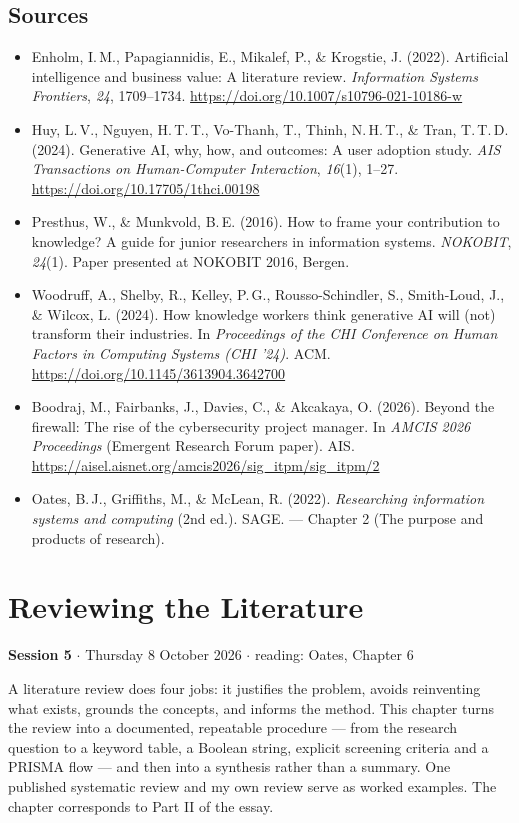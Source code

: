 \documentclass[11pt,a4paper,british,twoside=false,headings=small,chapterprefix=false,numbers=noenddot]{scrbook}
\newcommand{\sessionhead}[2]{\begin{tcolorbox}[enhanced, colback=uiamutedblue, colframe=uiamutedblue, arc=1.5pt, left=6pt, right=6pt]
  \small \textbf{Session #1} \;$\cdot$\; #2\end{tcolorbox}}
\begin{document}
\section*{Sources}
\begin{itemize}\small
  \item Enholm, I.\,M., Papagiannidis, E., Mikalef, P., \& Krogstie, J. (2022). Artificial intelligence and business value: A literature review. \emph{Information Systems Frontiers}, \emph{24}, 1709--1734. \url{https://doi.org/10.1007/s10796-021-10186-w}
  \item Huy, L.\,V., Nguyen, H.\,T.\,T., Vo-Thanh, T., Thinh, N.\,H.\,T., \& Tran, T.\,T.\,D. (2024). Generative AI, why, how, and outcomes: A user adoption study. \emph{AIS Transactions on Human-Computer Interaction}, \emph{16}(1), 1--27. \url{https://doi.org/10.17705/1thci.00198}
  \item Presthus, W., \& Munkvold, B.\,E. (2016). How to frame your contribution to knowledge? A guide for junior researchers in information systems. \emph{NOKOBIT}, \emph{24}(1). Paper presented at NOKOBIT 2016, Bergen.
  \item Woodruff, A., Shelby, R., Kelley, P.\,G., Rousso-Schindler, S., Smith-Loud, J., \& Wilcox, L. (2024). How knowledge workers think generative AI will (not) transform their industries. In \emph{Proceedings of the CHI Conference on Human Factors in Computing Systems (CHI '24)}. ACM. \url{https://doi.org/10.1145/3613904.3642700}
  \item Boodraj, M., Fairbanks, J., Davies, C., \& Akcakaya, O. (2026). Beyond the firewall: The rise of the cybersecurity project manager. In \emph{AMCIS 2026 Proceedings} (Emergent Research Forum paper). AIS. \url{https://aisel.aisnet.org/amcis2026/sig_itpm/sig_itpm/2}
  \item Oates, B.\,J., Griffiths, M., \& McLean, R. (2022). \emph{Researching information systems and computing} (2nd ed.). SAGE. --- Chapter 2 (The purpose and products of research).
\end{itemize}

\chapter{Reviewing the Literature}
\label{ch:5}
\sessionhead{5}{Thursday 8 October 2026 \;$\cdot$\; reading: Oates, Chapter 6}

A literature review does four jobs: it justifies the problem, avoids reinventing what exists, grounds the concepts, and informs the method. This chapter turns the review into a documented, repeatable procedure --- from the research question to a keyword table, a Boolean string, explicit screening criteria and a PRISMA flow --- and then into a synthesis rather than a summary. One published systematic review and my own review serve as worked examples. The chapter corresponds to Part II of the essay.
\end{document}
